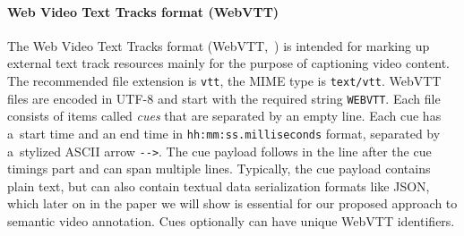 \documentclass{sig-alternate}
\begin{document}
\paragraph{Web Video Text Tracks format (WebVTT)}

The Web Video Text Tracks format (WebVTT,~\cite{pfeiffer2013webvtt})
is intended for marking up external text track resources mainly
for the purpose of captioning video content.
The recommended file extension is \texttt{vtt},
the MIME type is \texttt{text/vtt}.
WebVTT files are encoded in UTF-8 and
start with the required string \texttt{WEBVTT}.
Each file consists of items called \emph{cues}
that are separated by an empty line.
Each cue has a~start time and an end time in
\texttt{hh:mm:ss.milliseconds} format,
separated by a~stylized ASCII arrow \texttt{-}\texttt{->}.
The cue payload follows in the line after the cue timings part
and can span multiple lines.
Typically, the cue payload contains plain text,
but can also contain textual data serialization formats like JSON,
which later on in the paper we will show is essential
for our proposed approach to semantic video annotation.
Cues optionally can have unique WebVTT identifiers.

\begin{comment}
\begin{table}[b!]\footnotesize
\begin{tabular}{ r p{5.5cm} } %
\textbf{WebVTT Kind} & \textbf{Description and Default Behavior}\\

\texttt{subtitles} & Transcription or translation of speech,
suitable for when sound is available but not understood.
Overlaid on the video.\\

\texttt{captions} & Transcription or translation of the dialogue,
sound effects, and other relevant audio information,
suitable for when sound is unavailable or not clearly audible.
Overlaid on the video;
labeled as appropriate for the hard-of-hearing.\\

\texttt{descriptions} & Textual descriptions of the video component
of the media resource, intended for audio synthesis
when the visual component is obscured, unavailable, or unusable.
Synthesized as audio.\\

\texttt{chapters} & Chapter titles, intended to be used for navigating
the media resource. Displayed as an interactive (potentially nested)
list in the user agent's interface.\\

\texttt{metadata} & Metadata intended for use from script context.
Not displayed by user agent.\\
\end{tabular}
  \caption{WebVTT text track kinds in HTML5~\cite{berjon2013html5}}
  \label{table:texttrackkinds}
\end{table}
\end{comment}
\end{document}
